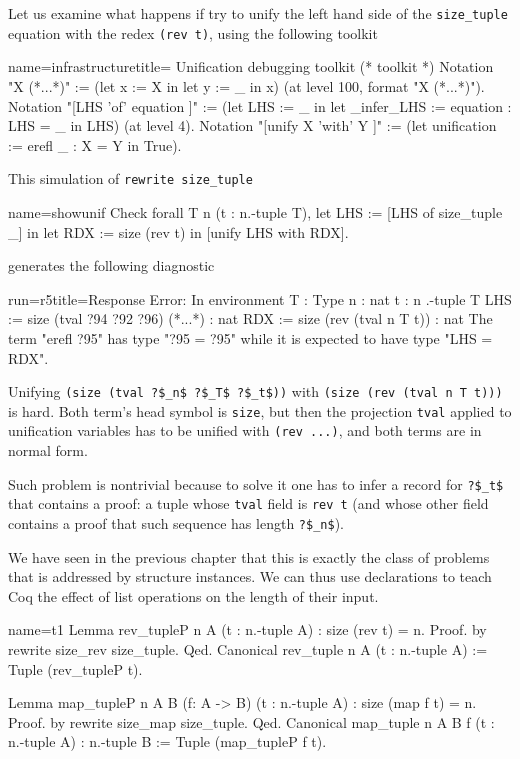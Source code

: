 Let us examine what happens if try to unify the left hand side of the
\lstinline/size_tuple/ equation with the redex
\lstinline/(rev t)/, using the following toolkit

\begin{coq}{name=infrastructure}{title= Unification debugging toolkit}
(* toolkit *)
Notation "X (*...*)" := (let x := X in let y := _ in x)
  (at level 100, format "X  (*...*)").
Notation "[LHS 'of' equation ]" :=
  (let LHS := _ in
   let _infer_LHS := equation : LHS = _ in LHS)
  (at level 4).
Notation "[unify X 'with' Y ]" :=
  (let unification := erefl _ : X = Y in
   True).
\end{coq}

This simulation of \lstinline/rewrite size_tuple/

\begin{coq}{name=showunif}{}
Check forall T n (t : n.-tuple T),
 let LHS := [LHS of size_tuple _] in
 let RDX := size (rev t) in
 [unify LHS with RDX].
\end{coq}

generates the following diagnostic

\begin{coqout}{run=r5}{title=Response}
Error:
In environment
T : Type
n : nat
t : n .-tuple T
LHS := size (tval ?94 ?92 ?96) (*...*) : nat
RDX := size (rev (tval n T t))           : nat
The term "erefl ?95" has type "?95 = ?95" while
it is expected to have type "LHS = RDX".
\end{coqout}

Unifying \lstinline/(size (tval ?$_n$ ?$_T$ ?$_t$))/
with \lstinline/(size (rev (tval n T t)))/ is hard.
Both term's head symbol is \lstinline/size/, but then
the projection \lstinline/tval/ applied to unification
variables has to be unified with \lstinline/(rev ...)/,
and both terms are in normal form.

Such problem is nontrivial because to solve it one has to infer a
record for \lstinline/?$_t$/ that contains a proof: a
tuple whose \lstinline/tval/ field
is \lstinline/rev t/ (and whose other field contains a
proof that such sequence has length \lstinline/?$_n$/).

We have seen in the previous chapter that this is exactly the class of
problems that is addressed by  structure instances.
We can thus use  declarations to teach Coq
the effect of list operations on the length of their input.

\begin{coq}{name=t1}{}
Lemma rev_tupleP n A (t : n.-tuple A) : size (rev t) = n.
Proof. by rewrite size_rev size_tuple. Qed.
Canonical rev_tuple n A (t : n.-tuple A) := Tuple (rev_tupleP t).

Lemma map_tupleP n A B (f: A -> B) (t : n.-tuple A) : size (map f t) = n.
Proof. by rewrite size_map size_tuple. Qed.
Canonical map_tuple n A B f (t : n.-tuple A) : n.-tuple B :=
  Tuple (map_tupleP f t).
\end{coq}

